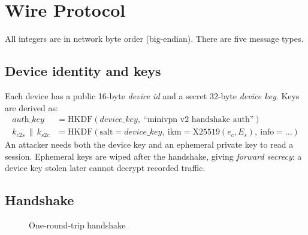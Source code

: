 \documentclass[12pt,a4paper]{report}
\begin{document}
\section{Wire Protocol}
All integers are in network byte order (big-endian). There are five message types.

\subsection{Device identity and keys}
Each device has a public 16-byte \emph{device id} and a secret 32-byte \emph{device key}.
Keys are derived as:
\[
\begin{aligned}
\textit{auth\_key} &= \mathrm{HKDF}(\textit{device\_key},\ \text{``minivpn v2 handshake auth''})\\
k_{c2s} \,\|\, k_{s2c} &= \mathrm{HKDF}(\text{salt}=\textit{device\_key},\ \text{ikm}=\mathrm{X25519}(e_c, E_s),\ \text{info}=\ldots)
\end{aligned}
\]
An attacker needs both the device key and an ephemeral private key to read a session.
Ephemeral keys are wiped after the handshake, giving \emph{forward secrecy}: a device
key stolen later cannot decrypt recorded traffic.

\subsection{Handshake}
\begin{figure}[H]
\centering
{}
\caption{One-round-trip handshake}
\label{fig:handshake}
\end{figure}
\end{document}
